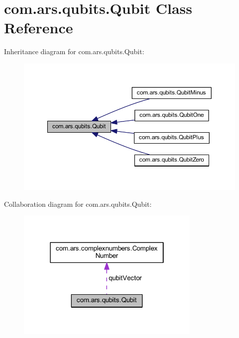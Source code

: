 \hypertarget{classcom_1_1ars_1_1qubits_1_1_qubit}{}\section{com.\+ars.\+qubits.\+Qubit Class Reference}
\label{classcom_1_1ars_1_1qubits_1_1_qubit}


Inheritance diagram for com.\+ars.\+qubits.\+Qubit\+:\nopagebreak
\begin{figure}[H]
\begin{center}
\leavevmode
\includegraphics[width=350pt]{classcom_1_1ars_1_1qubits_1_1_qubit__inherit__graph}
\end{center}
\end{figure}


Collaboration diagram for com.\+ars.\+qubits.\+Qubit\+:\nopagebreak
\begin{figure}[H]
\begin{center}
\leavevmode
\includegraphics[width=250pt]{classcom_1_1ars_1_1qubits_1_1_qubit__coll__graph}
\end{center}
\end{figure}
